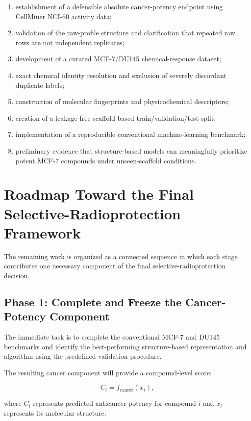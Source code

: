 \documentclass[11pt,a4paper]{article}
\begin{document}
\begin{enumerate}[leftmargin=1.6em]
    \item establishment of a defensible absolute cancer-potency endpoint using CellMiner NCI-60 activity data;
    \item validation of the raw-profile structure and clarification that repeated raw rows are not independent replicates;
    \item development of a curated MCF-7/DU145 chemical-response dataset;
    \item exact chemical identity resolution and exclusion of severely discordant duplicate labels;
    \item construction of molecular fingerprints and physicochemical descriptors;
    \item creation of a leakage-free scaffold-based train/validation/test split;
    \item implementation of a reproducible conventional machine-learning benchmark;
    \item preliminary evidence that structure-based models can meaningfully prioritize potent MCF-7 compounds under unseen-scaffold conditions.
\end{enumerate}

\section{Roadmap Toward the Final Selective-Radioprotection Framework}

The remaining work is organized as a connected sequence in which each stage contributes one necessary component of the final selective-radioprotection decision.

\subsection{Phase 1: Complete and Freeze the Cancer-Potency Component}

The immediate task is to complete the conventional MCF-7 and DU145 benchmarks and identify the best-performing structure-based representation and algorithm using the predefined validation procedure.

The resulting cancer component will provide a compound-level score:

\[
C_i = f_{\mathrm{cancer}}(x_i),
\]

where $C_i$ represents predicted anticancer potency for compound $i$ and $x_i$ represents its molecular structure.
\end{document}
